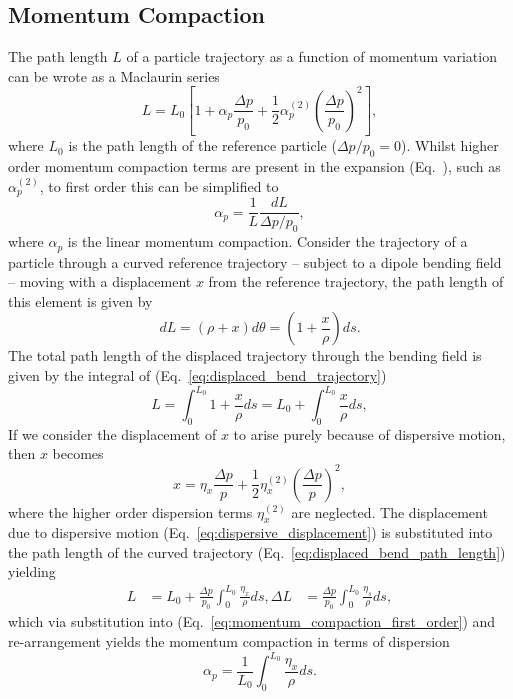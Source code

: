 \documentclass[../main.tex]{subfiles}
\begin{document}
\subsection{Momentum Compaction}
\label{sec:momentum_compaction}

The path length $L$ of a particle trajectory as a function of momentum variation can be wrote as a Maclaurin series \cite{wolski2012longitudinal}
\begin{equation}
L = L_{0}\left[1+\alpha_{p}\frac{\Delta p}{p_{0}}+\frac{1}{2}\alpha_{p}^{\left(2\right)}\left(\frac{\Delta p}{p_{0}}\right)^{2}\right],
\label{eq:path_length_expansion}    
\end{equation}
where $L_{0}$ is the path length of the reference particle ($\Delta p/p_{0}=0$). Whilst higher order momentum compaction terms are present in the expansion (Eq.~), such as $\alpha_{p}^{\left(2\right)}$, to first order this can be simplified to
\begin{equation}
\alpha_{p} = \frac{1}{L}\frac{dL}{\Delta p/p_{0}},
\label{eq:momentum_compaction_first_order}    
\end{equation}
where $\alpha_{p}$ is the linear momentum compaction. Consider the trajectory of a particle through a curved reference trajectory -- subject to a dipole bending field -- moving with a displacement $x$ from the reference trajectory, the path length of this element is given by
\begin{equation}
dL = \left(\rho+x\right)d\theta = \left(1+\frac{x}{\rho}\right)ds.
\label{eq:displaced_bend_trajectory}    
\end{equation}
The total path length of the displaced trajectory through the bending field is given by the integral of (Eq.~\ref{eq:displaced_bend_trajectory})
\begin{equation}
L = \int_{0}^{L_{0}} 1+\frac{x}{\rho} ds = L_{0} + \int_{0}^{L_{0}}\frac{x}{\rho}ds, 
\label{eq:displaced_bend_path_length}    
\end{equation}
If we consider the displacement of $x$ to arise purely because of dispersive motion, then $x$ becomes
\begin{equation}
x = \eta_{x}\frac{\Delta p}{p} + \frac{1}{2}\eta_{x}^{\left(2\right)}\left(\frac{\Delta p}{p}\right)^{2},
\label{eq:dispersive_displacement}    
\end{equation}
where the higher order dispersion terms $\eta_{x}^{\left(2\right)}$ are neglected. The displacement due to dispersive motion (Eq.~\ref{eq:dispersive_displacement}) is substituted into the path length of the curved trajectory (Eq.~\ref{eq:displaced_bend_path_length}) yielding
\begin{align}
L &= L_{0} + \frac{\Delta p}{p_{0}}\int_{0}^{L_{0}}\frac{\eta_{x}}{\rho}ds,
\Delta L &= \frac{\Delta p}{p_{0}}\int_{0}^{L_{0}}\frac{\eta_{s}}{\rho}ds,
\label{eq:dispersive_path_length_variation}
\end{align}
which via substitution into (Eq.~\ref{eq:momentum_compaction_first_order}) and re-arrangement yields the momentum compaction in terms of dispersion
\begin{equation}
\alpha_{p} = \frac{1}{L_{0}}\int_{0}^{L_{0}}\frac{\eta_{x}}{\rho}ds.
\label{eq:momentum_compaction_dispersion}    
\end{equation}
\end{document}
